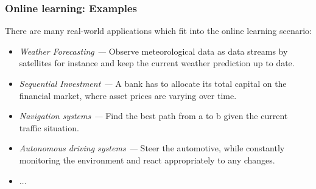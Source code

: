 \begin{frame}
	\frametitle{Online learning: Examples}
	\small
	There are many real-world applications which fit into the online learning scenario:
	\begin{itemize} \small
		  \item \emph{Weather Forecasting ---} Observe meteorological data as data streams by satellites for instance and keep the current weather prediction up to date.
		  \item \emph{Sequential Investment ---} A bank has to allocate its total capital on the financial market, where asset prices are varying over time.
		  \item \emph{Navigation systems ---} Find the best path from a to b given the current traffic situation.
		  \item \emph{Autonomous driving systems ---} Steer the automotive, while constantly monitoring the environment and react appropriately to any changes.
		  \item $\ldots$
%		  
	\end{itemize}
\end{frame}


